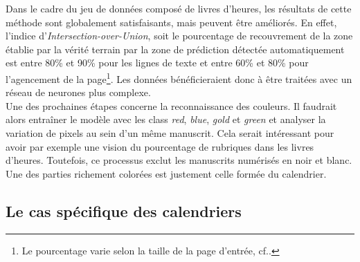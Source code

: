 \documentclass[a4paper,12pt,twoside]{book}
\begin{document}
    Dans le cadre du jeu de données composé de livres d'heures, les résultats de cette méthode sont globalement satisfaisants, mais peuvent être améliorés. En effet, l'indice d'\textit{Intersection-over-Union}, soit le pourcentage de recouvrement de la zone établie par la vérité terrain par la zone de prédiction détectée automatiquement est entre 80\% et 90\% pour les lignes de texte et entre 60\% et 80\% pour l'agencement de la page\footnote{Le pourcentage varie selon la taille de la page d'entrée, cf.\cite[p. 10]{annotated_dataset_book_hours}.}. Les données bénéficieraient donc à être traitées avec un réseau de neurones plus complexe. \\
    
    Une des prochaines étapes concerne la reconnaissance des couleurs. Il faudrait alors entraîner le modèle avec les class \og \textit{red}\fg{}, \og \textit{blue}\fg{}, \og \textit{gold}\fg{} et \og \textit{green}\fg{} et analyser la variation de pixels au sein d’un même manuscrit. Cela serait intéressant pour avoir par exemple une vision du pourcentage de rubriques dans les livres d'heures. Toutefois, ce processus exclut les manuscrits numérisés en noir et blanc. \\
    
    Une des parties richement colorées est justement celle formée du calendrier.
    
    
    \subsection{Le cas spécifique des calendriers}
    
\end{document}
